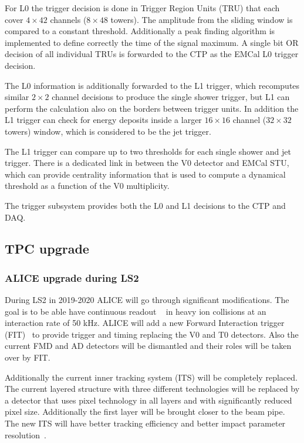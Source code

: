 For L0 the trigger decision is done in Trigger Region Units (TRU) that each cover $4\times42$ channels ($8\times48$ towers). The amplitude from the sliding window is compared to a constant threshold. Additionally a peak finding algorithm is implemented to define correctly the time of the signal maximum. A single bit OR decision of all individual TRUs is forwarded to the CTP as the EMCal L0 trigger decision.

The L0 information is additionally forwarded to the L1 trigger, which recomputes similar $2\times2$ channel decisions to produce the single shower trigger, but L1 can perform the calculation also on the borders between trigger units. In addition the L1 trigger can  check for energy deposits inside a larger $16\times16$ channel ($32\times32$ towers) window, which is considered to be the jet trigger.

The L1 trigger can compare up to two thresholds for each single shower and jet trigger. There is a dedicated link in between the V0 detector and EMCal STU, which can provide centrality information that is used to compute a dynamical threshold as a function of the V0 multiplicity.

The trigger subsystem provides both the L0 and L1 decisions to the CTP and DAQ. 


\subsection{TPC upgrade}
\label{sec:tpcupgrade}
\subsubsection{ALICE upgrade during LS2}
During LS2 in 2019-2020 ALICE will go through significant modifications. The goal is to be able have continuous readout ~\cite{aliceupgrade} in heavy ion collisions at an interaction rate of 50 kHz.  ALICE will add a new Forward Interaction trigger (FIT)~\cite{Maevskaya:2019bba} to provide trigger and timing replacing the V0 and T0 detectors. Also the current FMD and AD detectors will be dismantled and their roles will be taken over by FIT.

Additionally the current inner tracking system (ITS) will be completely replaced. The current layered structure with three different technologies will be replaced by a detector that uses pixel technology in all layers and with significantly reduced pixel size. Additionally the first layer will be brought closer to the beam pipe. The new ITS will have better tracking efficiency and better impact parameter resolution~\cite{ITSupgrade}. 

